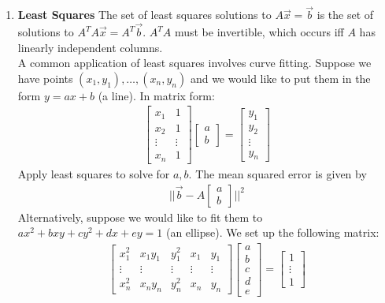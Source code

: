 \documentclass[10pt]{article}
\newcommand{\norm}[1]{\lvert #1 \rvert}
\begin{document}
\begin{multicols}{2}
\begin{enumerate}
    \item \textbf{Least Squares} The set of least squares solutions to $A\vec{x}=\vec{b}$ is the set of solutions to $A^TA\vec{x}=A^T\vec{b}$. $A^TA$ must be invertible, which occurs iff $A$ has linearly independent columns. \\ A common application of least squares involves curve fitting. Suppose we have points $\left( x_1, y_1 \right), \hdots, \left( x_n, y_n \right)$ and we would like to put them in the form $y=ax+b$ (a line). In matrix form:
    \begin{align*}
        \begin{bmatrix}
        x_1 & 1 \\
        x_2 & 1 \\
        \vdots & \vdots \\
        x_n & 1
        \end{bmatrix}
        \begin{bmatrix}
        a \\
        b
        \end{bmatrix} = 
        \begin{bmatrix}
        y_1 \\ y_2 \\ \vdots \\ y_n
        \end{bmatrix}
    \end{align*}
    Apply least squares to solve for $a,b$. The mean squared error is given by 
    \begin{align*}
        \norm{\norm{\vec{b} - A\begin{bmatrix} a \\ b \end{bmatrix}}}^2
    \end{align*}
    Alternatively, suppose we would like to fit them to $ax^2+bxy+cy^2+dx+ey=1$ (an ellipse). We set up the following matrix:
    \begin{align*}
        \begin{bmatrix} 
        x^2_1 & x_1y_1 & y^2_1 & x_1 & y_1 \\
        \vdots & \vdots & \vdots & \vdots & \vdots \\
        x^2_n & x_ny_n & y^2_n & x_n & y_n
        \end{bmatrix}
        \begin{bmatrix} 
        a \\ b \\ c \\ d \\ e
        \end{bmatrix} =
        \begin{bmatrix} 1 \\ \vdots \\ 1 \end{bmatrix}
    \end{align*}
    

\end{enumerate}
\end{multicols}
\end{document}
